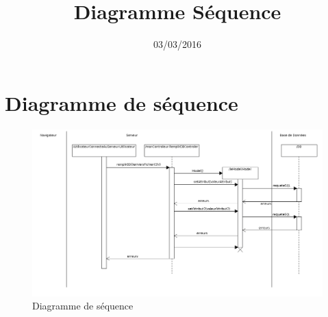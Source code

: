 \documentclass[asi, sansVersion]{picInsa}
\begin{document}
\title{Diagramme Séquence}
\author{\Melissa}
\date{03/03/2016} 

\maketitle

\tableofcontents

\chapter{Diagramme de séquence}

\begin{figure}
	\centering
	\includegraphics[scale=0.38]{images/diagrammeSequence.png}
	\caption{\label{modele}Diagramme de séquence}
\end{figure}
\end{document}
